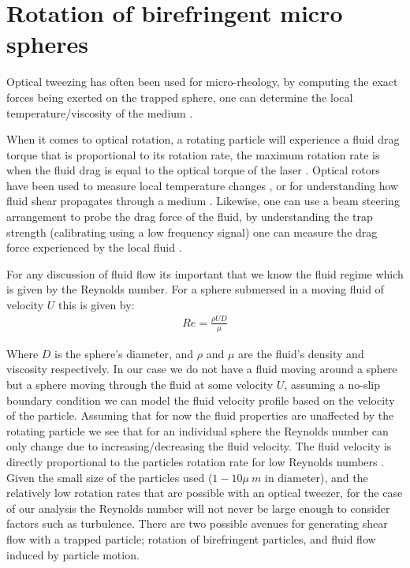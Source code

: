 \section{Rotation of birefringent micro spheres} 
Optical tweezing has often been used for micro-rheology, by computing the
exact forces being exerted on the trapped sphere, one can determine the
local temperature/viscosity of the medium \cite{Millen2014, RodriguezSevilla2018}.

When it comes to optical rotation, a rotating particle will experience a
fluid drag torque that is proportional to its rotation rate, the maximum 
rotation rate is when the fluid drag is equal to the optical torque 
of the laser \cite{RodriguezSevilla2018}. Optical rotors have been used
to measure local temperature changes \cite{Millen2014}, or for understanding 
how fluid shear propagates through a medium \cite{Knoener2005}. Likewise, 
one can use a beam steering arrangement to probe the drag force of the 
fluid, by understanding the trap strength (calibrating using a low 
frequency signal) one can measure the drag force experienced by the local 
fluid \cite{RobertsonAnderson2018}. 

For any discussion of fluid flow its important that we know the fluid 
regime which is given by the Reynolds number. For a sphere submersed in a 
moving fluid of velocity $U$ this is given by:
\begin{align}
	Re = \frac{\rho UD}{\mu}
\end{align}

Where $D$ is the sphere's diameter, and $\rho$ and $\mu$ are the fluid's 
density and viscosity respectively. In our case we do not have a fluid
moving around a sphere but a sphere moving through the fluid at some 
velocity $U$, assuming a no-slip boundary condition we can model the 
fluid velocity profile based on the velocity of the particle. Assuming
that for now the fluid properties are unaffected by the rotating particle
we see that for an individual sphere the Reynolds number can only change 
due to increasing/decreasing the fluid velocity. The fluid velocity is 
directly proportional to the particles rotation rate for low Reynolds
numbers \cite{Bruce2020}. Given the small size of the particles used 
($1-10\mu\ m$ in diameter), and the relatively low rotation rates that 
are possible with an optical tweezer, for the case of our analysis the
Reynolds number will not never be large enough to consider factors such
as turbulence. There are two possible avenues for generating shear flow 
with a trapped particle; rotation of birefringent particles, and fluid 
flow induced by particle motion. 

